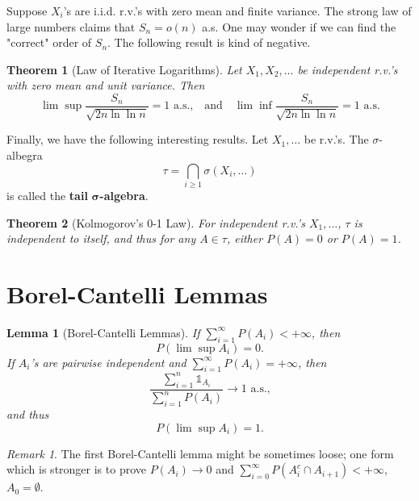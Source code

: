 \documentclass[openany]{book}
\newtheorem{lemma}{Lemma}[chapter]
\newtheorem{theorem}{Theorem}[chapter]
\theoremstyle{definition}
\theoremstyle{remark}
\newtheorem*{remark}{Remark}
\begin{document}
Suppose $X_i$'s are i.i.d. r.v.'s with zero mean and finite variance. The strong law of large numbers claims that $S_n=o(n)$ a.s. One may wonder if we can find the "correct" order of $S_n$. The following result is kind of negative.
\begin{theorem}[Law of Iterative Logarithms]
    Let $X_1,X_2,\ldots$ be independent r.v.'s with zero mean and unit variance. Then
    \begin{equation*}
        \lim\sup\frac{S_n}{\sqrt{2n\ln\ln n}}=1\textrm{ a.s.,}\quad\textrm{and}\quad\lim\inf\frac{S_n}{\sqrt{2n\ln\ln n}}=1\textrm{ a.s.}
    \end{equation*}
\end{theorem}

Finally, we have the following interesting results. Let $X_1,\ldots$ be r.v.'s. The $\sigma$-albegra
\begin{equation*}
    \tau=\bigcap_{i\ge1}\sigma\left(X_i,\ldots\right)
\end{equation*}
is called the \textbf{tail} $\boldsymbol{\sigma}$\textbf{-algebra}.
\begin{theorem}[Kolmogorov's 0-1 Law]
    For independent r.v.'s $X_1,\ldots$, $\tau$ is independent to itself, and thus for any $A\in\tau$, either $P(A)=0$ or $P(A)=1$.
\end{theorem}

\section{Borel-Cantelli Lemmas}\label{sec:BorelCantelli}
\begin{lemma}[Borel-Cantelli Lemmas]
    If $\sum_{i=1}^{\infty}P(A_i)<+\infty$, then
    \begin{equation*}
        P\left(\lim\sup A_i\right)=0.
    \end{equation*}
    If $A_i$'s are pairwise independent and $\sum_{i=1}^{\infty}P(A_i)=+\infty$, then
    \begin{equation*}
        \frac{\sum_{i=1}^{n}\mathds{1}_{A_i}}{\sum_{i=1}^{n}P(A_i)}\to1\textrm{ a.s.,}
    \end{equation*}
    and thus
    \begin{equation*}
        P\left(\lim\sup A_i\right)=1.
    \end{equation*}
\end{lemma}
\begin{remark}
    The first Borel-Cantelli lemma might be sometimes loose; one form which is stronger is to prove $P(A_i)\to0$ and $\sum_{i=0}^{\infty}P\left(A_i^c\cap A_{i+1}\right)<+\infty$, $A_0=\emptyset$.
\end{remark}
\end{document}
